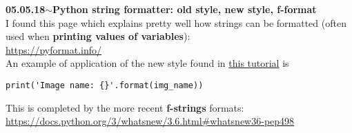\documentclass[11pt,a4paper]{article}
\newenvironment{loggentry}[2]%
{\noindent\textbf{#1}\hspace{1cm}$\mathbf{\sim}$\text{ }\textbf{#2}\\}{\vspace{0.5cm}}
\begin{document}
\begin{loggentry}{05.05.18}{Python string formatter: old style, new style, f-format}
I found this page which explains pretty well how strings can be formatted (often used when \textbf{printing values of variables}):\\
\url{https://pyformat.info/}\\
An example of application of the new style found in \href{https://pytorch.org/tutorials/beginner/data_loading_tutorial.html#sphx-glr-beginner-data-loading-tutorial-py}{this tutorial} is
\begin{verbatim}
print('Image name: {}'.format(img_name))
\end{verbatim}
This is completed by the more recent \textbf{f-strings} formats:\\
\url{https://docs.python.org/3/whatsnew/3.6.html#whatsnew36-pep498}\\
\end{loggentry}
\end{document}
